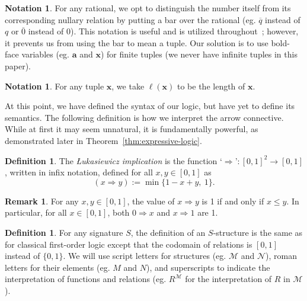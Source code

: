 \documentclass{amsart}
\theoremstyle{definition}
\newtheorem{remark}[theorem]{Remark}
\newtheorem{definition}[theorem]{Definition}
\newtheorem{notation}[theorem]{Notation}
\numberwithin{equation}{theorem}
\newcommand{\V}{\mathbf}
\newcommand{\rat}[1]{{\overline{#1}}}
\newcommand{\narrow}[1]{\xrightarrow{#1}}
\renewcommand{\to}{\narrow{}}
\newcommand{\len}{\ell}
\begin{document}
\begin{notation}
  For any rational, we opt to distinguish the number itself from its corresponding nullary relation by putting a bar over the rational (eg. $\rat q$ instead of $q$ or $\rat 0$ instead of $0$).
  This notation is useful and is utilized throughout~\cite{hajek1998metamathematics}; however, it prevents us from using the bar to mean a tuple.
  Our solution is to use bold-face variables (eg. $\V a$ and $\V x$) for finite tuples (we never have infinite tuples in this paper).
\end{notation}
\begin{notation}
  For any tuple $\V x$, we take $\len(\V x)$ to be the length of $\V x$.
\end{notation}
At this point, we have defined the syntax of our logic, but have yet to define its semantics.
The following definition is how we interpret the arrow connective.
While at first it may seem unnatural, it is fundamentally powerful, as demonstrated later in Theorem~\ref{thm:expressive-logic}.
\begin{definition}
  The \emph{{\L}ukasiewicz implication} is the function `$\Rightarrow$'$:[0,1]^2\to[0,1]$, written in infix notation, defined for all $x,y\in[0,1]$ as
  \[
    (x\Rightarrow y) := \min\{1-x+y,\ 1\}.
  \]
\end{definition}
\begin{remark}
  For any $x,y\in[0,1]$, the value of $x\Rightarrow y$ is 1 if and only if $x\leq y$.
  In particular, for all $x\in[0,1]$, both $0\Rightarrow x$ and $x\Rightarrow 1$ are 1.
\end{remark}
\begin{definition}
  For any signature $S$, the definition of an $S$-structure is the same as for classical first-order logic except that the codomain of relations is $[0,1]$ instead of $\{0,1\}$.
  We will use script letters for structures (eg. $\mathcal M$ and $\mathcal N$), roman letters for their elements (eg. $M$ and $N$), and superscripts to indicate the interpretation of functions and relations (eg. $R^\mathcal M$ for the interpretation of $R$ in $\mathcal M$).
\end{definition}
\end{document}
